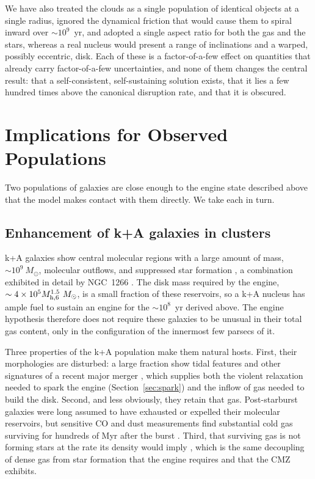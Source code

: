 \documentclass[preprint2]{aastex}
\newcommand{\msun}{M_{\odot}\xspace}
\newcommand{\mhsix}{M_{\rm h,6}\xspace}
\begin{document}
We have also treated the clouds as a single population of identical objects at a single radius, ignored the dynamical friction that would cause them to spiral inward over $\sim 10^{9}$~yr, and adopted a single aspect ratio for both the gas and the stars, whereas a real nucleus would present a range of inclinations and a warped, possibly eccentric, disk. Each of these is a factor-of-a-few effect on quantities that already carry factor-of-a-few uncertainties, and none of them changes the central result: that a self-consistent, self-sustaining solution exists, that it lies a few hundred times above the canonical disruption rate, and that it is obscured.

\section{Implications for Observed Populations}\label{sec:implications}

Two populations of galaxies are close enough to the engine state described above that the model makes contact with them directly. We take each in turn.

\subsection{Enhancement of k+A galaxies in clusters}\label{subsec:ka}

k+A galaxies show central molecular regions with a large amount of mass, $\sim 10^{9}~\msun$, molecular outflows, and suppressed star formation \citep{French:2015a,Smercina:2018a}, a combination exhibited in detail by NGC~1266 \citep{Alatalo:2011a,Alatalo:2014a,Alatalo:2015a}. The disk mass required by the engine, $\sim 4 \times 10^{5} \mhsix^{1.5}~\msun$, is a small fraction of these reservoirs, so a k+A nucleus has ample fuel to sustain an engine for the $\sim 10^{8}$~yr derived above. The engine hypothesis therefore does not require these galaxies to be unusual in their total gas content, only in the configuration of the innermost few parsecs of it.

Three properties of the k+A population make them natural hosts. First, their morphologies are disturbed: a large fraction show tidal features and other signatures of a recent major merger \citep{Zabludoff:1996a}, which supplies both the violent relaxation needed to spark the engine (Section~\ref{sec:spark}) and the inflow of gas needed to build the disk. Second, and less obviously, they retain that gas. Post-starburst galaxies were long assumed to have exhausted or expelled their molecular reservoirs, but sensitive CO and dust measurements find substantial cold gas surviving for hundreds of Myr after the burst \citep{French:2015a,Smercina:2018a}. Third, that surviving gas is not forming stars at the rate its density would imply \citep{French:2018a}, which is the same decoupling of dense gas from star formation that the engine requires and that the CMZ exhibits.
\end{document}
